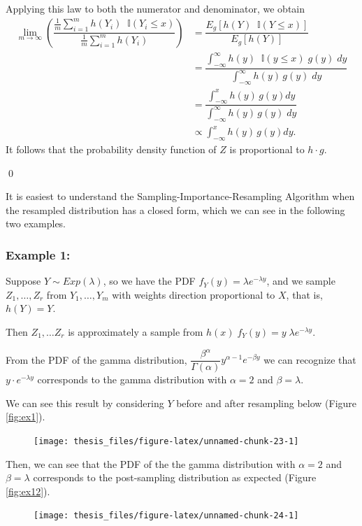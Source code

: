 \documentclass[12pt,twoside]{smiththesis}
\begin{document}
Applying this law to both the numerator and denominator, we obtain
\begin{align*}  \lim_{m \to \infty} \left( \dfrac{ \frac 1m {\sum_{i=1}^mh(Y_i) }  \;\;\mathbb{I} (Y_i \leq x) }{\frac 1m \sum_{i=1}^mh(Y_i) } \right) &= \dfrac{ E_g[ h(Y) \;\; \mathbb I (Y \leq x) ]  }{ E_g[ h(Y) ]  }\\
&= \dfrac{\int_{-\infty}^\infty h(y) \;\; \mathbb I (y \leq x) \; g(y) \; dy}{\int_{-\infty}^\infty h(y) \, g(y) \;dy}\\
&= \dfrac{\int_{-\infty}^x h(y) \, g(y) dy}{\int_{-\infty}^\infty h(y) \, g(y) \;dy}\\
&\propto \int_{-\infty}^x h(y) \, g(y) dy. 
\end{align*}
It follows that the probability density function of \(Z\) is proportional to \(h \cdot g\).

\vspace{3 mm}

\qed

It is easiest to understand the Sampling-Importance-Resampling Algorithm when the resampled distribution has a closed form, which we can see in the following two examples.

\newpage

\hypertarget{example-1}{%
\subsubsection{Example 1:}\label{example-1}}

Suppose \(Y \sim Exp(\lambda)\), so we have the PDF \(f_Y(y) = \lambda e^{-\lambda y}\), and we sample \(Z_1,\dots,Z_r\) from \(Y_1, \dots, Y_m\) with weights direction proportional to \(X\), that is, \(h(Y) = Y\).

Then \(Z_1,\dots Z_r\) is approximately a sample from \(h(x) \; f_Y(y) = y \; \lambda e^{-\lambda y}\).

From the PDF of the gamma distribution, \(\dfrac{\beta^\alpha}{\Gamma(\alpha) }y^{\alpha - 1} e^{-\beta y}\) we can recognize that \(y \cdot e^{-\lambda y}\) corresponds to the gamma distribution with \(\alpha = 2\) and \(\beta = \lambda\).

We can see this result by considering \(Y\) before and after resampling below (Figure \ref{fig:ex1}).
\begin{figure}

{\centering \texttt{[image: thesis\_files/figure-latex/unnamed-chunk-23-1]} 

}

\caption{\label{fig:ex1}}\label{fig:unnamed-chunk-23}
\end{figure}
Then, we can see that the PDF of the the gamma distribution with \(\alpha = 2\) and \(\beta = \lambda\) corresponds to the post-sampling distribution as expected (Figure \ref{fig:ex12}).
\begin{figure}

{\centering \texttt{[image: thesis\_files/figure-latex/unnamed-chunk-24-1]} 

}

\caption{\label{fig:ex12}}\label{fig:unnamed-chunk-24}
\end{figure}
\newpage
\end{document}
